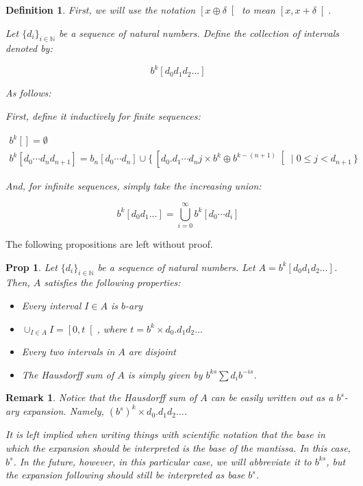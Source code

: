 \documentclass[11pt, reqno]{amsart}
\newcommand{\N}{\mathbb{N}}
\newtheorem{prop}{Prop}
\newtheorem{definition}{Definition}
\newtheorem{remark}{Remark}
\begin{document}
\begin{definition}
First, we will use the notation $\left[ x \oplus \delta \right[$ to mean $\left[x, x+\delta \right[$.

Let $\{d_i\}_{i \in \N}$ be a sequence of natural numbers. Define the collection of intervals denoted by:

\[ b^k [d_0 d_1 d_2 \dots] \]

As follows:

First, define it inductively for finite sequences:

\begin{gather*}
b^k [] = \emptyset\\
b^k [d_0 \cdots d_n d_{n+1}] = b_n [d_0 \cdots d_n] \cup \{\,\left[d_0 . d_1 \cdots d_n j \times b^k \oplus b^{k-(n+1)} \right[ \mid 0 \leq j < d_{n+1} \,\}
\end{gather*}

And, for infinite sequences, simply take the increasing union:

\[ b^k[d_0 d_1 \dots] = \bigcup_{i = 0}^\infty b^k[d_0 \cdots d_i] \]

\end{definition}

The following propositions are left without proof.

\begin{prop}
Let $\{d_i\}_{i \in \N}$ be a sequence of natural numbers. Let $A = b^k [d_0 d_1 d_2 \dots]$. Then, $A$ satisfies the following properties:

\begin{itemize}
\item Every interval $I \in A$ is $b$-ary

\item $\cup_{I \in A} I = \left[ 0, t \right[$, where $t = b^k \times d_0 . d_1 d_2 \dots$

\item Every two intervals in $A$ are disjoint

\item The Hausdorff sum of $A$ is simply given by $b^{ks} \sum d_i b^{-is}$.
\end{itemize}

\end{prop}

\begin{remark}
Notice that the Hausdorff sum of $A$ can be easily written out as a $b^s$-ary expansion. Namely, $(b^s)^k \times d_0 . d_1 d_ 2 \dots$.

It is left implied when writing things with scientific notation that the base in which the expansion should be interpreted is the base of the mantissa. In this case, $b^s$. In the future, however, in this particular case, we will abbreviate it to $b^{ks}$, but the expansion following should still be interpreted as base $b^s$.
\end{remark}
\end{document}
